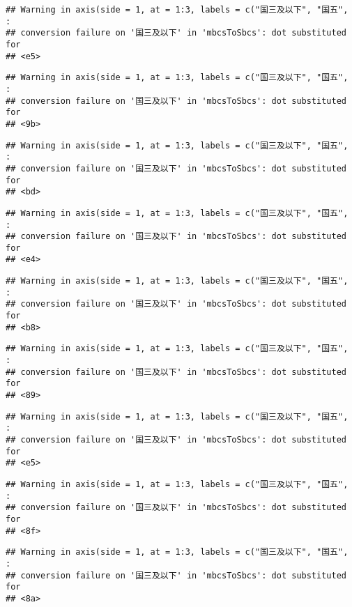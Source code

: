 \documentclass[]{article}
\begin{document}
\begin{verbatim}
## Warning in axis(side = 1, at = 1:3, labels = c("国三及以下", "国五", :
## conversion failure on '国三及以下' in 'mbcsToSbcs': dot substituted for
## <e5>
\end{verbatim}

\begin{verbatim}
## Warning in axis(side = 1, at = 1:3, labels = c("国三及以下", "国五", :
## conversion failure on '国三及以下' in 'mbcsToSbcs': dot substituted for
## <9b>
\end{verbatim}

\begin{verbatim}
## Warning in axis(side = 1, at = 1:3, labels = c("国三及以下", "国五", :
## conversion failure on '国三及以下' in 'mbcsToSbcs': dot substituted for
## <bd>
\end{verbatim}

\begin{verbatim}
## Warning in axis(side = 1, at = 1:3, labels = c("国三及以下", "国五", :
## conversion failure on '国三及以下' in 'mbcsToSbcs': dot substituted for
## <e4>
\end{verbatim}

\begin{verbatim}
## Warning in axis(side = 1, at = 1:3, labels = c("国三及以下", "国五", :
## conversion failure on '国三及以下' in 'mbcsToSbcs': dot substituted for
## <b8>
\end{verbatim}

\begin{verbatim}
## Warning in axis(side = 1, at = 1:3, labels = c("国三及以下", "国五", :
## conversion failure on '国三及以下' in 'mbcsToSbcs': dot substituted for
## <89>
\end{verbatim}

\begin{verbatim}
## Warning in axis(side = 1, at = 1:3, labels = c("国三及以下", "国五", :
## conversion failure on '国三及以下' in 'mbcsToSbcs': dot substituted for
## <e5>
\end{verbatim}

\begin{verbatim}
## Warning in axis(side = 1, at = 1:3, labels = c("国三及以下", "国五", :
## conversion failure on '国三及以下' in 'mbcsToSbcs': dot substituted for
## <8f>
\end{verbatim}

\begin{verbatim}
## Warning in axis(side = 1, at = 1:3, labels = c("国三及以下", "国五", :
## conversion failure on '国三及以下' in 'mbcsToSbcs': dot substituted for
## <8a>
\end{verbatim}
\end{document}
